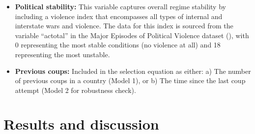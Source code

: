 \documentclass[
  12pt,
]{report}
\providecommand{\tightlist}{%
  \setlength{\itemsep}{0pt}\setlength{\parskip}{0pt}}\usepackage{longtable,booktabs,array}
\begin{document}
\begin{itemize}
\tightlist
\item
  \textbf{Political stability:} This variable captures overall regime
  stability by including a violence index that encompasses all types of
  internal and interstate wars and violence. The data for this index is
  sourced from the variable ``actotal'' in the Major Episodes of
  Political Violence dataset (), with 0 representing the most stable conditions (no
  violence at all) and 18 representing the most unstable.
\item
  \textbf{Previous coups:} Included in the selection equation as either:
  a) The number of previous coups in a country (Model 1), or b) The time
  since the last coup attempt (Model 2 for robustness check).
\end{itemize}

\section{Results and discussion}\label{results-and-discussion}
\end{document}
